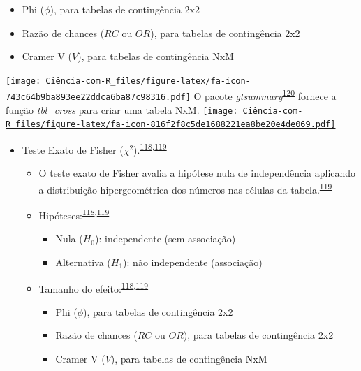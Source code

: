 \documentclass[
]{book}
\begin{document}
\begin{itemize}
\begin{itemize}
    \begin{itemize}
    \item
      Phi (\(\phi\)), para tabelas de contingência 2x2
    \item
      Razão de chances (\(RC\) ou \(OR\)), para tabelas de contingência 2x2
    \item
      Cramer V (\(V\)), para tabelas de contingência NxM
    \end{itemize}
  \end{itemize}
\end{itemize}

\texttt{[image: Ciência-com-R\_files/figure-latex/fa-icon-743c64b9ba893ee22ddca6ba87c98316.pdf]} O pacote \emph{gtsummary}\textsuperscript{\protect\hyperlink{ref-gtsummary}{120}} fornece a função \emph{tbl\_cross} para criar uma tabela NxM. \href{https://cran.r-project.org/web/packages/gtsummary/index.html}{\texttt{[image: Ciência-com-R\_files/figure-latex/fa-icon-816f2f8c5de1688221ea8be20e4de069.pdf]}}

\begin{itemize}
\item
  Teste Exato de Fisher (\(\chi^2\)).\textsuperscript{\protect\hyperlink{ref-McHugh2013}{118},\protect\hyperlink{ref-Kim2017a}{119}}

  \begin{itemize}
  \item
    O teste exato de Fisher avalia a hipótese nula de independência aplicando a distribuição hipergeométrica dos números nas células da tabela.\textsuperscript{\protect\hyperlink{ref-Kim2017a}{119}}
  \item
    Hipóteses:\textsuperscript{\protect\hyperlink{ref-McHugh2013}{118},\protect\hyperlink{ref-Kim2017a}{119}}

    \begin{itemize}
    \item
      Nula (\(H_{0}\)): independente (sem associação)
    \item
      Alternativa (\(H_{1}\)): não independente (associação)
    \end{itemize}
  \item
    Tamanho do efeito:\textsuperscript{\protect\hyperlink{ref-McHugh2013}{118},\protect\hyperlink{ref-Kim2017a}{119}}

    \begin{itemize}
    \item
      Phi (\(\phi\)), para tabelas de contingência 2x2
    \item
      Razão de chances (\(RC\) ou \(OR\)), para tabelas de contingência 2x2
    \item
      Cramer V (\(V\)), para tabelas de contingência NxM
    \end{itemize}
  \end{itemize}
\end{itemize}
\end{document}
